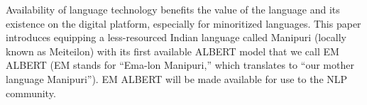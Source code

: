 Availability of language technology benefits the value of the language and its existence on the digital platform, especially for minoritized languages. This paper introduces equipping a less-resourced Indian language called Manipuri (locally known as Meiteilon) with its first available ALBERT model that we call EM ALBERT (EM stands for ``Ema-lon Manipuri,'' which translates to ``our mother language Manipuri''). EM ALBERT will be made available for use to the NLP community.
